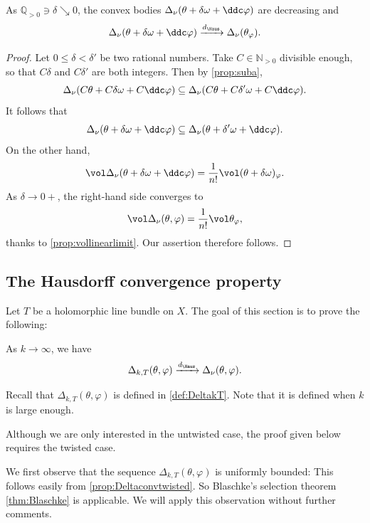 \begin{proposition}\label{prop:Deltapert}
    As $\mathbb{Q}_{>0}\ni\delta\searrow 0$, the convex bodies $\Delta_{\nu}(\theta+\delta\omega+\ddc\varphi)$ are decreasing and
    \[
    \Delta_{\nu}(\theta+\delta\omega+\ddc\varphi)\xrightarrow{d_{\Haus}} \Delta_{\nu}(\theta_{\varphi}).
    \]
\end{proposition}

\begin{proof}
	Let $0\leq \delta<\delta'$ be two rational numbers. Take $C\in \mathbb{N}_{>0}$ divisible enough, so that $C\delta$ and $C\delta'$ are both integers. Then by \cref{prop:suba},
	\[
		\Delta_{\nu}(C\theta+C\delta\omega+C\ddc\varphi)\subseteq \Delta_{\nu}(C\theta+C\delta'\omega+C\ddc \varphi).
	\]
	It follows that
	\[
		\Delta_{\nu}(\theta+\delta\omega+\ddc\varphi)\subseteq \Delta_{\nu}(\theta+\delta'\omega+\ddc\varphi).
	\]
	On the other hand,
	\[
		\vol   \Delta_{\nu}(\theta+\delta\omega+\ddc\varphi)=\frac{1}{n!}\vol (\theta+\delta\omega)_{\varphi}.
	\]
	As $\delta\to 0+$, the right-hand side converges to
	\[
		\vol \Delta_{\nu}(\theta,\varphi)=\frac{1}{n!}\vol \theta_{\varphi},
	\]
    thanks to \cref{prop:vollinearlimit}.
	Our assertion therefore follows.
\end{proof}

\subsection{The Hausdorff convergence property}
\label{subsec:HCP}
Let $T$ be a holomorphic line bundle on $X$. The goal of this section is to prove the following:
\begin{theorem}\label{thm:HCP}
    As $k\to\infty$, we have
    \begin{equation}\label{eq:HCP1}
    \Delta_{k,T}(\theta,\varphi)\xrightarrow{d_{\Haus}} \Delta_{\nu}(\theta,\varphi).
    \end{equation}
\end{theorem}
Recall that $\Delta_{k,T}(\theta,\varphi)$ is defined in \cref{def:DeltakT}. Note that it is defined when $k$ is large enough.

Although we are only interested in the untwisted case, the proof given below requires the twisted case.

We first observe that the sequence $\Delta_{k,T}(\theta,\varphi)$ is uniformly bounded: This follows easily from \cref{prop:Deltaconvtwisted}. So Blaschke's selection theorem \cref{thm:Blaschke} is applicable. We will apply this observation without further comments.


